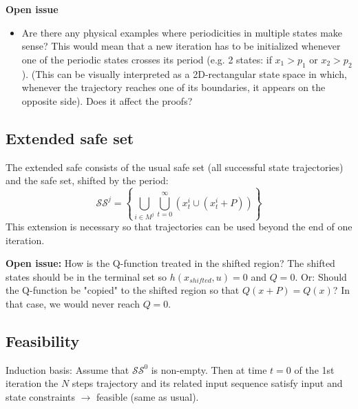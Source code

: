 \documentclass{article}
\begin{document}
\textbf{Open issue}
\begin{itemize}
\item Are there any physical examples where periodicities in multiple states make sense? This would mean that a new iteration has to be initialized whenever one of the periodic states crosses its period (e.g. 2 states: if $x_1>p_1$ or $x_2>p_2$). (This can be visually interpreted as a 2D-rectangular state space in which, whenever the trajectory reaches one of its boundaries, it appears on the opposite side). Does it affect the proofs?
\end{itemize}
\subsection{Extended safe set}
The extended safe consists of the usual safe set (all successful state trajectories) and the safe set, shifted by the period:
\[
\mathcal{SS}^j = \left\{ \bigcup_{i\in M^j} \bigcup_{t=0}^\infty \left(x_t^i\cup \left(x_t^i+P\right)\right)\right\}
\]
This extension is necessary so that trajectories can be used beyond the end of one iteration.

\textbf{Open issue:}
How is the Q-function treated in the shifted region? The shifted states should be in the terminal set so $h(x_{shifted},u)=0$ and $Q=0$. Or: Should the Q-function be "copied" to the shifted region so that $Q(x+P) = Q(x)$? In that case, we would never reach $Q=0$.

%
\subsection{Feasibility}
Induction basis: Assume that $\mathcal{SS}^0$ is non-empty. Then at time $t=0$ of the 1st iteration the $N$ steps trajectory and its related input sequence satisfy input and state constraints $\rightarrow$ feasible (same as usual).
\end{document}
